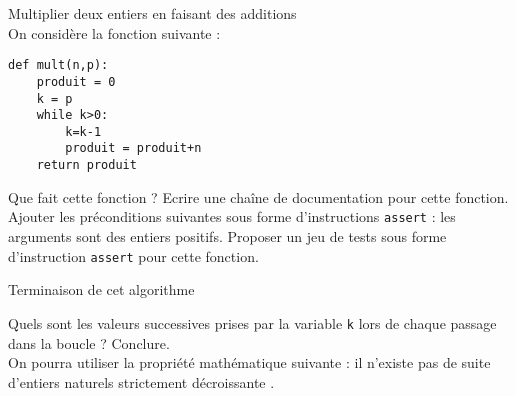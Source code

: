 \documentclass[11pt,a4paper]{article}
\begin{document}
\begin{Exercise}[title={Terminaison d'un algorithme}]

\Question Multiplier deux entiers en faisant des additions \\
On considère la fonction suivante :
\begin{lstlisting}
def mult(n,p):
    produit = 0
    k = p
    while k>0:
        k=k-1
        produit = produit+n
    return produit
\end{lstlisting}

\subQuestion Que fait cette fonction ?  
\subQuestion Ecrire une chaîne de documentation pour cette fonction.
\subQuestion Ajouter les préconditions suivantes sous forme d'instructions \texttt{assert} : les arguments sont des entiers positifs.
\subQuestion Proposer un jeu de tests sous forme d'instruction \texttt{assert} pour cette fonction.

\Question Terminaison de cet algorithme

\subQuestion Quels sont les valeurs successives prises par la variable \texttt{k}  lors de chaque passage dans la boucle ?
\subQuestion Conclure. \\
\aide \; On pourra utiliser la propriété mathématique suivante : \og il n'existe pas de suite d'entiers naturels strictement décroissante \fg. 
\end{Exercise}
\end{document}
